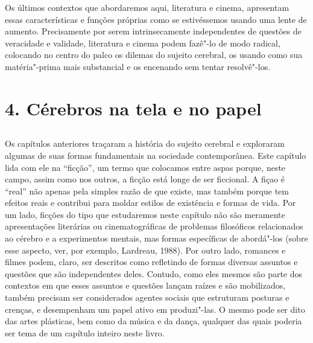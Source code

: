 Os últimos contextos que abordaremos aqui, literatura e cinema,
apresentam essas características e funções próprias como se estivéssemos
usando uma lente de aumento. Precisamente por serem intrinsecamente
independentes de questões de veracidade e validade, literatura e cinema
podem fazê"-lo de modo radical, colocando no centro do palco os dilemas
do sujeito cerebral, os usando como sua matéria"-prima mais substancial e
os encenando sem tentar resolvê"-los.

\part{4. Cérebros na tela e no papel}

\chapter*{}

Os capítulos anteriores traçaram a história do sujeito cerebral e
exploraram algumas de suas formas fundamentais na sociedade
contemporânea. Este capítulo lida com ele na ``ficção'', um termo que
colocamos entre aspas porque, neste campo, assim como nos outros, a
ficção está longe de ser ficcional. A fiçao é ``real'' não apenas pela
simples razão de que existe, mas também porque tem efeitos reais e
contribui para moldar estilos de existência e formas de vida. Por um
lado, ficções do tipo que estudaremos neste capítulo não são meramente
apresentações literárias ou cinematográficas de problemas filosóficos
relacionados ao cérebro e a experimentos mentais, mas formas específicas
de abordá"-los (sobre esse aspecto, ver, por exemplo, Lardreau, 1988).
Por outro lado, romances e filmes podem, claro, ser descritos como
refletindo de formas diversas assuntos e questões que são independentes
deles. Contudo, como eles mesmos são parte dos contextos em que esses
assuntos e questões lançam raízes e são mobilizados, também precisam ser
considerados agentes sociais que estruturam posturas e crenças, e
desempenham um papel ativo em produzi"-las. O mesmo pode ser dito das
artes plásticas, bem como da música e da dança, qualquer das quais
poderia ser tema de um capítulo inteiro neste livro.

